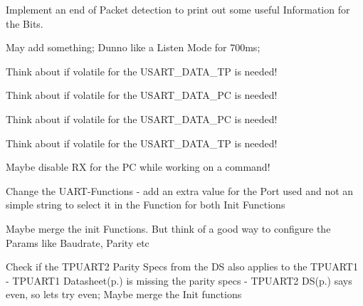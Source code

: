 
\begin{DoxyRefList}
\item[\label{todo__todo000002}%
\hypertarget{todo__todo000002}{}%
Global \hyperlink{shell_8h_ad95c9c45c97cc744ca49a98494bf9465}{act\+\_\+busmon} (void)]Implement an end of Packet detection to print out some useful Information for the Bits. 
\item[\label{todo__todo000003}%
\hypertarget{todo__todo000003}{}%
Global \hyperlink{shell_8h_a5c364cd022ec191bccd57afa8aae1e89}{act\+\_\+busymode} (void)]May add something; Dunno like a Listen Mode for 700ms;  
\item[\label{todo__todo000008}%
\hypertarget{todo__todo000008}{}%
Global \hyperlink{_u_a_r_t_8c_abbfd0611f43db59ea4fdb1ea434cf017}{I\+SR} (U\+S\+A\+R\+T\+C0\+\_\+\+D\+R\+E\+\_\+vect)]Think about if volatile for the U\+S\+A\+R\+T\+\_\+\+D\+A\+T\+A\+\_\+\+TP is needed! 
\item[\label{todo__todo000009}%
\hypertarget{todo__todo000009}{}%
Global \hyperlink{_u_a_r_t_8c_a6c9949e5146d1feb028b0c2db8754523}{I\+SR} (U\+S\+A\+R\+T\+C1\+\_\+\+R\+X\+C\+\_\+vect)]Think about if volatile for the U\+S\+A\+R\+T\+\_\+\+D\+A\+T\+A\+\_\+\+PC is needed!  
\item[\label{todo__todo000010}%
\hypertarget{todo__todo000010}{}%
Global \hyperlink{_u_a_r_t_8c_acdf978f69a52b8a2225b0536b5fbff0e}{I\+SR} (U\+S\+A\+R\+T\+C1\+\_\+\+D\+R\+E\+\_\+vect)]Think about if volatile for the U\+S\+A\+R\+T\+\_\+\+D\+A\+T\+A\+\_\+\+PC is needed! 
\item[\label{todo__todo000007}%
\hypertarget{todo__todo000007}{}%
Global \hyperlink{_u_a_r_t_8c_aace195abde7bc36b7b50772ff2277dd4}{I\+SR} (U\+S\+A\+R\+T\+C0\+\_\+\+R\+X\+C\+\_\+vect)]Think about if volatile for the U\+S\+A\+R\+T\+\_\+\+D\+A\+T\+A\+\_\+\+TP is needed! 
\item[\label{todo__todo000001}%
\hypertarget{todo__todo000001}{}%
File \hyperlink{shell_8c}{shell.c} ]Maybe disable RX for the PC while working on a command!  
\item[\label{todo__todo000004}%
\hypertarget{todo__todo000004}{}%
File \hyperlink{_u_a_r_t_8c}{U\+A\+RT.c} ]Change the U\+A\+R\+T-\/\+Functions -\/ add an extra value for the Port used and not an simple string to select it in the Function for both Init Functions  
\item[\label{todo__todo000006}%
\hypertarget{todo__todo000006}{}%
Global \hyperlink{_u_a_r_t_8h_a267c0b0bf7f4f8b70049d91449590cf8}{usart\+\_\+init\+\_\+pc} (void)]Maybe merge the init Functions. But think of a good way to configure the Params like Baudrate, Parity etc  
\item[\label{todo__todo000005}%
\hypertarget{todo__todo000005}{}%
Global \hyperlink{_u_a_r_t_8h_a09e438e4f709b00836cebb0d6a44f223}{usart\+\_\+init\+\_\+tpuart} (void)]Check if the T\+P\+U\+A\+R\+T2 Parity Specs from the DS also applies to the T\+P\+U\+A\+R\+T1 -\/ T\+P\+U\+A\+R\+T1 Datasheet(p.) is missing the parity specs -\/ T\+P\+U\+A\+R\+T2 DS(p.) says even, so lets try even; Maybe merge the Init functions 
\end{DoxyRefList}